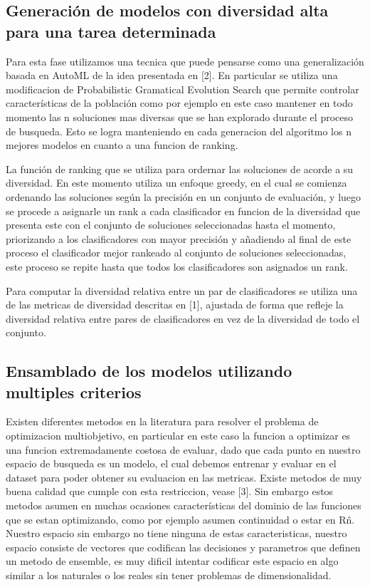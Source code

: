 \documentclass[runningheads,a4paper]{llncs}
\begin{document}
	\subsection*{Generación de modelos con diversidad alta para una tarea determinada}
	
	Para esta fase utilizamos una tecnica que puede pensarse como una generalización basada en AutoML de
	la idea presentada en [2]. En particular se utiliza una modificacion de
	Probabilistic Gramatical Evolution Search que permite controlar características de la población como
	por ejemplo en este caso mantener en todo momento las n soluciones mas diversas que se han explorado
	durante el proceso de busqueda. Esto se logra manteniendo en cada generacion del algoritmo los n mejores
	modelos en cuanto a una funcion de ranking.
	
	La función de ranking que se utiliza para ordernar las soluciones de acorde a su diversidad. En este
	momento utiliza un enfoque greedy, en el cual se comienza ordenando las soluciones según la precisión
	en un conjunto de evaluación, y luego se procede a asignarle un rank a cada clasificador en funcion
	de la diversidad que presenta este con el conjunto de soluciones seleccionadas hasta el momento,
	priorizando a los clasificadores con mayor precisión y añadiendo al final de este proceso el
	clasificador mejor rankeado al conjunto de soluciones seleccionadas, este proceso se repite hasta
	que todos los clasificadores son asignados un rank.
	
	Para computar la diversidad relativa entre un par de clasificadores se utiliza una de las metricas
	de diversidad descritas en [1], ajustada de forma que refleje la diversidad
	relativa entre pares de clasificadores en vez de la diversidad de todo el conjunto.
	
	\subsection*{Ensamblado de los modelos utilizando multiples criterios}

    Existen diferentes metodos en la literatura para resolver el problema de optimizacion multiobjetivo,
    en particular en este caso la funcion a optimizar es una funcion extremadamente costosa de evaluar,
    dado que cada punto en nuestro espacio de busqueda es un modelo, el cual debemos entrenar y evaluar
    en el dataset para poder obtener su evaluacion en las metricas. Existe metodos de muy buena calidad
    que cumple con esta restriccion, vease [3]. Sin embargo estos metodos asumen en muchas ocasiones
    características del dominio de las funciones que se estan optimizando, como por ejemplo asumen
    continuidad o estar en R\^n. Nuestro espacio sin embargo no tiene ninguna de estas caracteristicas,
    nuestro espacio consiste de vectores que codifican las decisiones y parametros que definen un metodo de
    ensemble, es muy dificil intentar codificar este espacio en algo similar a los naturales o los reales
    sin tener problemas de dimensionalidad.
	
\end{document}
